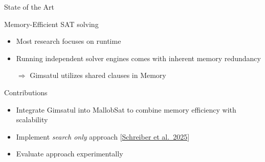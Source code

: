 \documentclass[]{sdqbeamer}
\begin{document}
\begin{frame}{State of the Art}
    \begin{block}{Memory-Efficient SAT solving}
        \begin{itemize}
            \item Most research focuses on runtime
            \item Running independent solver engines comes with inherent memory redundancy
            \item[$\Rightarrow$] Gimsatul utilizes shared clauses in Memory
        \end{itemize}
    \end{block}

    \begin{block}{Contributions}
        \begin{itemize}
            \item Integrate Gimsatul into MallobSat to combine memory efficiency with scalability
            \item Implement \textit{search only} approach [\href{https://satres.kikit.kit.edu/papers/2025-sat-streamlining-pre.pdf}{Schreiber et al.~2025}]
            \item Evaluate approach experimentally
        \end{itemize}
    \end{block}
\end{frame}
\end{document}
